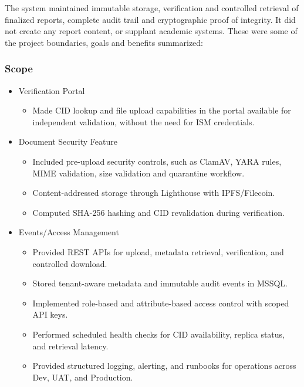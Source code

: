 The system maintained immutable storage, verification and controlled retrieval of finalized reports, complete audit trail and cryptographic proof of integrity. It did not create any report content, or supplant academic systems. These were some of the project boundaries, goals and benefits summarized:

        \subsubsection{Scope}
        \begin{itemize}

            \item Verification Portal
                \begin{itemize}
                    \item Made CID lookup and file upload capabilities in the portal available for independent validation, without the need for ISM credentials.
                \end{itemize}
                
            \item Document Security Feature
                \begin{itemize}
                    \item Included pre-upload security controls, such as ClamAV, YARA rules, MIME validation, size validation and quarantine workflow.
                    \item Content-addressed storage through Lighthouse with IPFS/Filecoin.
                    \item Computed SHA-256 hashing and CID revalidation during verification.
                \end{itemize}
                
            \item Events/Access Management
                \begin{itemize}
                    \item Provided REST APIs for upload, metadata retrieval, verification, and controlled download.
                    \item Stored tenant-aware metadata and immutable audit events in MSSQL.
                    \item Implemented role-based and attribute-based access control with scoped API keys.
                    \item Performed scheduled health checks for CID availability, replica status, and retrieval latency.
                    \item Provided structured logging, alerting, and runbooks for operations across Dev, UAT, and Production.
                \end{itemize}
                

\end{itemize}
